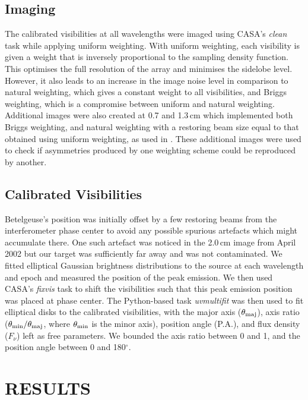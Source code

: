 \documentclass[iop]{emulateapj}
\begin{document}
\subsection{Imaging}\label{obs2.1}
The calibrated visibilities at all wavelengths were imaged using CASA's \textit{clean} task while applying uniform weighting. With uniform weighting, each visibility is given a weight that is inversely proportional to the sampling density function. This optimises the full resolution of the array and minimises the sidelobe level. However, it also leads to an increase in the image noise level in comparison to natural weighting, which gives a constant weight to all visibilities, and Briggs weighting, which is a compromise between uniform and natural weighting. Additional images were also created at 0.7 and 1.3\,cm which implemented both Briggs weighting, and natural weighting with a restoring beam size equal to that obtained using uniform weighting, as used in \cite{lim_1998}. These additional images were used to check if asymmetries produced by one weighting scheme could be reproduced by another.

\subsection{Calibrated Visibilities}
Betelgeuse's position was initially offset by a few restoring beams from the interferometer phase center to avoid any possible spurious artefacts which might accumulate there. One such artefact was noticed in the 2.0\,cm image from April 2002 but our target was sufficiently far away and was not contaminated. We fitted elliptical Gaussian brightness distributions to the source at each wavelength and epoch and measured the position of the peak emission. We then used CASA's \textit{fixvis} task to shift the visibilities such that this peak emission position was placed at phase center. The Python-based task \textit{uvmultifit} \citep{marti_vidal_2014} was then used to fit elliptical disks to the calibrated visibilities, with the major axis ($\theta _{\rm{maj}}$), axis ratio ($\theta _{\rm{min}}/\theta _{\rm{maj}}$, where $\theta _{\rm{min}}$ is the minor axis), position angle (P.A.), and flux density ($F_{\nu}$) left as free parameters. We bounded the axis ratio between 0 and 1, and the position angle between 0 and 180$^{\circ}$.

\section{RESULTS} 
\end{document}
